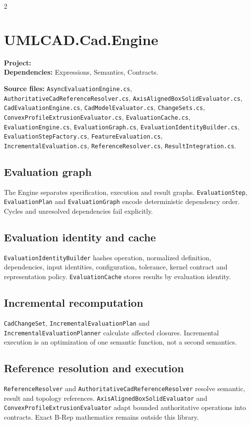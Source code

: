 \documentclass[10pt,a4paper]{article}
\newcommand{\code}[1]{\nolinkurl{#1}}
\newcommand{\filepath}[1]{\path{#1}}
\begin{document}
\begin{multicols}{2}
\section{UMLCAD.Cad.Engine}
\textbf{Project:} \filepath{dotnet/src/UMLCAD.Cad.Engine/}\\
\textbf{Dependencies:} Expressions, Semantics, Contracts.

\textbf{Source files:} \code{AsyncEvaluationEngine.cs}, \code{AuthoritativeCadReferenceResolver.cs}, \code{AxisAlignedBoxSolidEvaluator.cs}, \code{CadEvaluationEngine.cs}, \code{CadModelEvaluator.cs}, \code{ChangeSets.cs}, \code{ConvexProfileExtrusionEvaluator.cs}, \code{EvaluationCache.cs}, \code{EvaluationEngine.cs}, \code{EvaluationGraph.cs}, \code{EvaluationIdentityBuilder.cs}, \code{EvaluationStepFactory.cs}, \code{FeatureEvaluation.cs}, \code{IncrementalEvaluation.cs}, \code{ReferenceResolver.cs}, \code{ResultIntegration.cs}.

\subsection{Evaluation graph}
The Engine separates specification, execution and result graphs. \code{EvaluationStep}, \code{EvaluationPlan} and \code{EvaluationGraph} encode deterministic dependency order. Cycles and unresolved dependencies fail explicitly.

\subsection{Evaluation identity and cache}
\code{EvaluationIdentityBuilder} hashes operation, normalized definition, dependencies, input identities, configuration, tolerance, kernel contract and representation policy. \code{EvaluationCache} stores results by evaluation identity.

\subsection{Incremental recomputation}
\code{CadChangeSet}, \code{IncrementalEvaluationPlan} and \code{IncrementalEvaluationPlanner} calculate affected closures. Incremental execution is an optimization of one semantic function, not a second semantics.

\subsection{Reference resolution and execution}
\code{ReferenceResolver} and \code{AuthoritativeCadReferenceResolver} resolve semantic, result and topology references. \code{AxisAlignedBoxSolidEvaluator} and \code{ConvexProfileExtrusionEvaluator} adapt bounded authoritative operations into contracts. Exact B-Rep mathematics remains outside this library.


\end{multicols}
\end{document}
